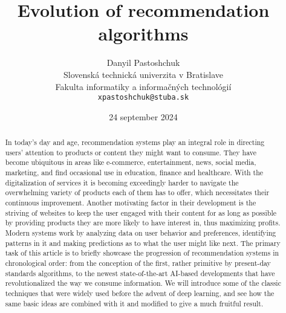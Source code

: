 \documentclass[]{article}
\title{Evolution of recommendation algorithms}
\author{Danyil Pastoshchuk\\[2pt]
	{\small Slovenská technická univerzita v Bratislave}\\
	{\small Fakulta informatiky a informačných technológií}\\
	{\small \texttt{xpastoshchuk@stuba.sk}}
}
\date{\small 24 september 2024}
\begin{document}
	
	

\maketitle
\begin{abstract}
In today’s day and age, recommendation systems play an integral role in directing users’ attention to products or content they might want to consume. They have become ubiquitous in areas like e-commerce, entertainment, news, social media, marketing, and find occasional use in education, finance and healthcare. With the digitalization of services it is becoming exceedingly harder to navigate the overwhelming variety of products each of them has to offer, which necessitates their continuous improvement. Another motivating factor in their development is the striving of websites to keep the user engaged with their content for as long as possible by providing products they are more likely to have interest in, thus maximizing profits. Modern systems work by analyzing data on user behavior and preferences, identifying patterns in it and making predictions as to what the user might like next. The primary task of this article is to briefly showcase the progression of recommendation systems in chronological order: from the conception of the first, rather primitive by present-day standards algorithms, to the newest state-of-the-art AI-based developments that have revolutionalized the way we consume information. We will introduce some of the classic techniques  that were widely used before the advent of deep learning, and see how the same basic ideas are combined with it and modified to give a much fruitful result.\cite{r1}\cite{r2}

\end{abstract}



\end{document}
